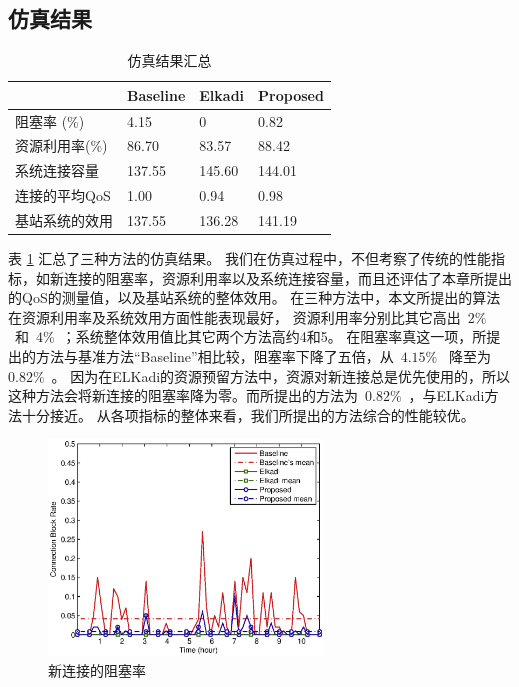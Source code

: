 \subsection{仿真结果}
%
\begin{table}[htbp]
\caption{仿真结果汇总} \label{tb:chap_cacop:res_sim}
\begin{center}
\wuhao
\begin{tabularx}{0.99\textwidth}{XXXX}
\toprule
&Baseline &Elkadi &Proposed\\
\midrule
阻塞率 (\%) &4.15 & 0 &0.82\\
资源利用率(\%) &86.70 &83.57 &88.42\\
系统连接容量 &137.55 &145.60 &144.01\\
连接的平均QoS &1.00 &0.94 &0.98\\
基站系统的效用 &137.55 &136.28 &141.19\\
\bottomrule
\end{tabularx}
\end{center}
\end{table}
表 \ref{tb:chap_cacop:res_sim} 汇总了三种方法的仿真结果。
我们在仿真过程中，不但考察了传统的性能指标，如新连接的阻塞率，资源利用率以及系统连接容量，而且还评估了本章所提出的QoS的测量值，以及基站系统的整体效用。
在三种方法中，本文所提出的算法在资源利用率及系统效用方面性能表现最好，
资源利用率分别比其它高出~$2\%$~和~$4\%$~；系统整体效用值比其它两个方法高约4和5。
在阻塞率真这一项，所提出的方法与基准方法“Baseline”相比较，阻塞率下降了五倍，从~$4.15\%$~ 降至为 ~$0.82\%$~。
因为在ELKadi的资源预留方法中，资源对新连接总是优先使用的，所以这种方法会将新连接的阻塞率降为零。而所提出的方法为~$0.82\%$~，与ELKadi方法十分接近。
从各项指标的整体来看，我们所提出的方法综合的性能较优。
%
\begin{figure}[htbp]
\centering
\includegraphics[width=0.65\textwidth] {cacop_block_rate.eps}
\caption{新连接的阻塞率} \label{fig:chap_cacop:clock_accept_block_drop}
\end{figure}

